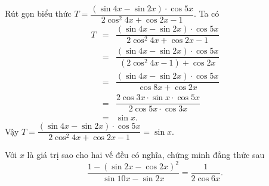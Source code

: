 \begin{bt}%
	Rút gọn biểu thức $T=\dfrac{(\sin 4 x-\sin 2 x) \cdot \cos 5 x}{2 \cos ^2 4 x+\cos 2 x-1}$.
	\loigiai
	{Ta có
		\allowdisplaybreaks
		\begin{eqnarray*}
			T
			&=& \dfrac{(\sin 4 x-\sin 2 x) \cdot \cos 5 x}{2 \cos ^2 4 x+\cos 2 x-1} \\
			&=&\dfrac{(\sin 4 x-\sin 2 x) \cdot \cos 5 x}{(2\cos ^2 4 x-1)+\cos 2 x} \\
			&=& \dfrac{(\sin 4 x-\sin 2 x) \cdot \cos 5 x}{\cos 8x+\cos 2 x} \\
			&=&\dfrac{2\cos 3x\cdot \sin x\cdot \cos 5 x}{2\cos 5x\cdot \cos 3x} \\
			&=& \sin x.
		\end{eqnarray*}
		Vậy $T=\dfrac{(\sin 4 x-\sin 2 x) \cdot \cos 5 x}{2 \cos ^2 4 x+\cos 2 x-1}=\sin x$.
	}
\end{bt}

\begin{bt}%
	Với $x$ là giá trị sao cho hai vế đều có nghĩa, chứng minh đẳng thức sau
	$$
	\dfrac{1-(\sin 2 x-\cos 2 x)^2}{\sin 10 x-\sin 2 x}=\dfrac{1}{2 \cos 6 x}.
	$$
\end{bt}

